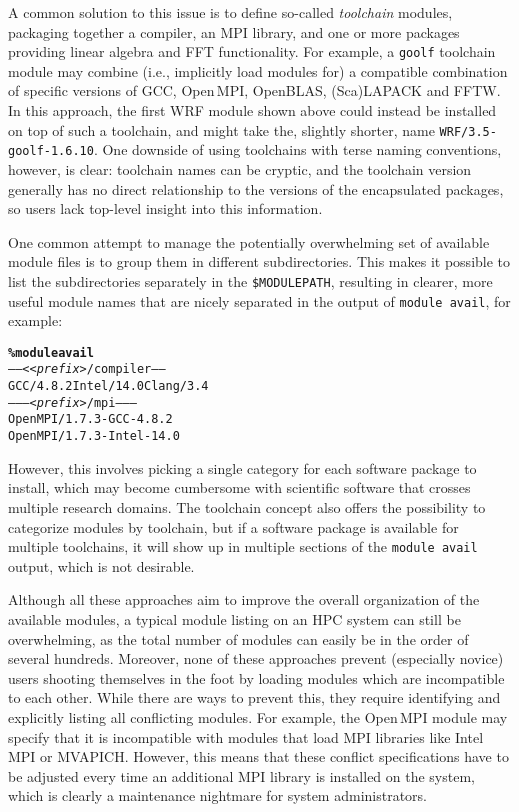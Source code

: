 A common solution to this issue is to define so-called \emph{toolchain}
modules, packaging together a compiler, an MPI library, and one or more packages
providing linear algebra and FFT functionality. For example, a \texttt{\small goolf}
toolchain module may combine (i.e., implicitly load modules for) a compatible combination of specific versions of GCC,
Open\,MPI, OpenBLAS, (Sca)LAPACK and FFTW. In this approach, the
first WRF module shown above could instead be installed on top of such a toolchain,
and might take the, slightly shorter, name \texttt{\small WRF/3.5-goolf-1.6.10}.
One downside of using toolchains with terse naming conventions, however, is clear: toolchain names can be cryptic, and the toolchain version generally has no direct relationship to the versions of the encapsulated packages, so users lack top-level insight into 
this information.

One common attempt to manage the potentially overwhelming set of available
module files is to group them in different subdirectories. This makes 
it possible to list the subdirectories separately in the
\texttt{\small\$MODULEPATH}, resulting in clearer, more useful
 module names that are
nicely separated in the output of
\texttt{\small module avail}, for example:
{\small
\begin{alltt}
    \textbf{\% module avail}
    ----- <\emph{<prefix>}/compiler -----
    GCC/4.8.2   Intel/14.0  Clang/3.4
    -------- \emph{<prefix>}/mpi --------
    OpenMPI/1.7.3-GCC-4.8.2
    OpenMPI/1.7.3-Intel-14.0\
\end{alltt}
}
\noindent
However, this involves picking a single category for each software package to
install, which may become cumbersome with scientific software that crosses multiple
research domains. The toolchain concept also offers the possibility to categorize
modules by toolchain, but if a software package is available for multiple
toolchains, it will show up in multiple sections of the \texttt{\small module
avail} output, which is not desirable.


Although all these approaches aim to improve the overall
organization of the available modules, a typical module listing on an HPC
system can still be overwhelming, as the total number of modules can easily
be in the order of several hundreds. Moreover, none of these approaches prevent (especially novice) users shooting themselves in the
foot by loading modules which are incompatible to each other. While
there are ways to prevent this, they require identifying and explicitly listing
all conflicting modules. For example, the Open\,MPI module may
specify that it is incompatible with modules that load MPI libraries like
Intel MPI or MVAPICH. However, this means that these conflict specifications have
to be adjusted every time an additional MPI library is installed on the
system, which is clearly a maintenance nightmare for system administrators.

